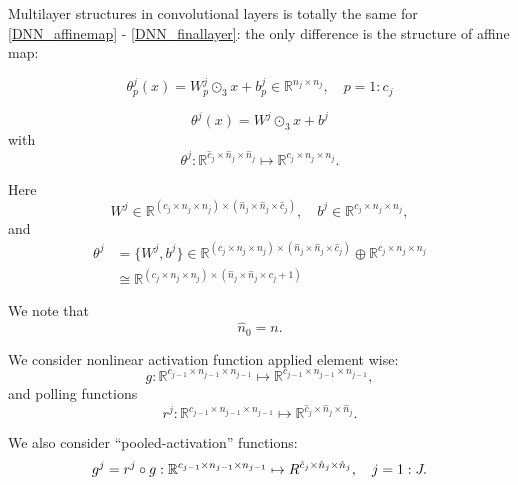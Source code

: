  Multilayer structures in convolutional layers is totally the same for \eqref{DNN_affinemap} - \eqref{DNN_finallayer}: the only difference  is the structure of affine map:

\begin{equation}\label{CNN_affinemap}
\theta^j_{p}(x) =  W^j_p \odot_3 x + b^j_p \in \mathbb R^{n_j \times n_j}, \quad p=1:c_j
\end{equation}

\begin{equation}\label{CNN_affinemap}
\theta^j(x) =  W^j\odot_3 x + b^j
\end{equation}
with
\begin{equation}
\theta^j: \mathbb R^{\hat c_j  \times \hat{n}_{j} \times \hat n_{j} } \mapsto \mathbb{R}^{c_j \times n_{j} \times n_j }.
\end{equation}

Here
\begin{equation}
W^j \in \mathbb{R}^{(c_j \times n_{j} \times n_j) \times
  (\hat{n}_{j} \times \hat n_{j}\times \hat c_{j} )}, \quad
b^j\in  \mathbb R^{c_j \times n_{j} \times n_j},
\end{equation}
and
\begin{align}
\theta^j  &= \{W^j , b^j\}  \in \mathbb{R}^{(c_j \times n_{j} \times n_j) \times
  (\hat{n}_{j} \times \hat n_{j}\times \hat c_{j} )} \oplus \mathbb R^{c_j \times n_{j} \times n_j} \\
  &\cong  \mathbb{R}^{(c_j \times n_{j} \times n_j) \times
  (\hat{n}_{j} \times \hat n_{j}\times c_{j} + 1 )}
\end{align}

We note that
\begin{equation}
\hat n_0 =n  .
\end{equation}

We consider nonlinear activation function applied element wise:
\begin{equation}\label{CNN_iteration_vector}
g: \mathbb R^{c_{j-1} \times n_{j-1} \times n_{j-1} }\mapsto  \mathbb R^{c_{j-1} \times n_{j-1} \times n_{j-1}},
\end{equation}
and polling functions
\begin{equation}\label{CNN_iteration_vector}
r^j: \mathbb R^{c_{j-1} \times n_{j-1} \times n_{j-1} }\mapsto  \mathbb R^{\hat c_j \times \hat n_{j} \times\hat n_j }.
\end{equation}

We also consider ``pooled-activation'' functions:
\begin{equation}\label{CNN_iteration_vector}
g^j=r^j\circ g:  \mathbb R^{c_{j-1} \times n_{j-1} \times n_{j-1} }\mapsto
\mathbb  \mathbb R^{\hat c_j \times \hat n_{j} \times \hat n_j }, \quad j  = 1:J.
\end{equation}



